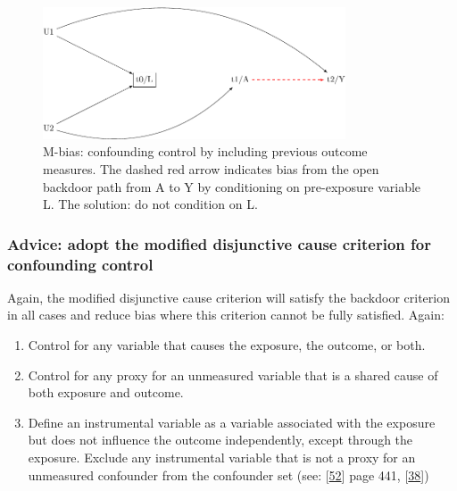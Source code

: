 \documentclass[
  singlecolumn]{article}
\providecommand{\tightlist}{%
  \setlength{\itemsep}{0pt}\setlength{\parskip}{0pt}}\usepackage{longtable,booktabs,array}
\begin{document}
\begin{figure}

{\centering \includegraphics[width=0.8\textwidth,height=\textheight]{causal-dags_files/figure-pdf/fig-m-bias-1.pdf}

}

\caption{\label{fig-m-bias}M-bias: confounding control by including
previous outcome measures. The dashed red arrow indicates bias from the
open backdoor path from A to Y by conditioning on pre-exposure variable
L. The solution: do not condition on L.}

\end{figure}

\hypertarget{advice-adopt-the-modified-disjunctive-cause-criterion-for-confounding-control}{%
\subsubsection{Advice: adopt the modified disjunctive cause criterion
for confounding
control}\label{advice-adopt-the-modified-disjunctive-cause-criterion-for-confounding-control}}

Again, the modified disjunctive cause criterion will satisfy the
backdoor criterion in all cases and reduce bias where this criterion
cannot be fully satisfied. Again:

\begin{enumerate}
\def\labelenumi{\alph{enumi}.}
\tightlist
\item
  Control for any variable that causes the exposure, the outcome, or
  both.
\item
  Control for any proxy for an unmeasured variable that is a shared
  cause of both exposure and outcome.
\item
  Define an instrumental variable as a variable associated with the
  exposure but does not influence the outcome independently, except
  through the exposure. Exclude any instrumental variable that is not a
  proxy for an unmeasured confounder from the confounder set (see:
  {[}\protect\hyperlink{ref-vanderweele2020}{52}{]} page 441,
  {[}\protect\hyperlink{ref-vanderweele2019}{38}{]})
\end{enumerate}
\end{document}
